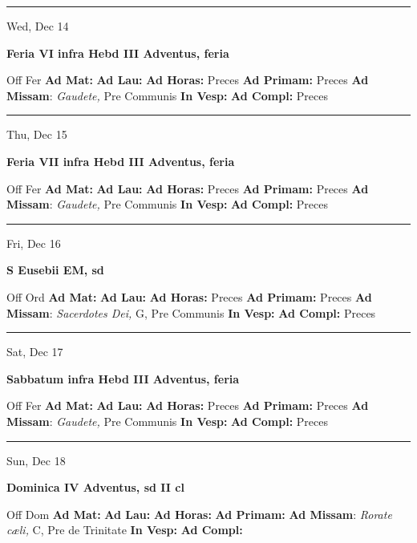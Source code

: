 \documentclass[letterpaper, 10pt]{article}
\begin{document}
\hrule
\begin{center}
Wed, Dec 14
\end{center}\textbf{ \large Feria VI infra Hebd III Adventus, \textnormal{\normalsize feria}}
\begin{justify}
Off Fer
\textbf{Ad Mat: }
\textbf{Ad Lau: }
\textbf{Ad Horas: }Preces
\textbf{Ad Primam: }Preces
\textbf{Ad Missam}: \textit{Gaudete,} Pre Communis
\textbf{In Vesp: }
\textbf{Ad Compl: }Preces\end{justify}



\hrule
\begin{center}
Thu, Dec 15
\end{center}\textbf{ \large Feria VII infra Hebd III Adventus, \textnormal{\normalsize feria}}
\begin{justify}
Off Fer
\textbf{Ad Mat: }
\textbf{Ad Lau: }
\textbf{Ad Horas: }Preces
\textbf{Ad Primam: }Preces
\textbf{Ad Missam}: \textit{Gaudete,} Pre Communis
\textbf{In Vesp: }
\textbf{Ad Compl: }Preces\end{justify}



\hrule
\begin{center}
Fri, Dec 16
\end{center}\textbf{ \large S Eusebii EM, \textnormal{\normalsize sd}}
\begin{justify}
Off Ord
\textbf{Ad Mat: }
\textbf{Ad Lau: }
\textbf{Ad Horas: }Preces
\textbf{Ad Primam: }Preces
\textbf{Ad Missam}: \textit{Sacerdotes Dei,} G, Pre Communis
\textbf{In Vesp: }
\textbf{Ad Compl: }Preces\end{justify}



\hrule
\begin{center}
Sat, Dec 17
\end{center}\textbf{ \large Sabbatum infra Hebd III Adventus, \textnormal{\normalsize feria}}
\begin{justify}
Off Fer
\textbf{Ad Mat: }
\textbf{Ad Lau: }
\textbf{Ad Horas: }Preces
\textbf{Ad Primam: }Preces
\textbf{Ad Missam}: \textit{Gaudete,} Pre Communis
\textbf{In Vesp: }
\textbf{Ad Compl: }Preces\end{justify}



\hrule
\begin{center}
Sun, Dec 18
\end{center}\textbf{ \large Dominica IV Adventus, \textnormal{\normalsize sd II cl}}
\begin{justify}
Off Dom
\textbf{Ad Mat: }
\textbf{Ad Lau: }
\textbf{Ad Horas: }
\textbf{Ad Primam: }
\textbf{Ad Missam}: \textit{Rorate cæli,} C, Pre de Trinitate
\textbf{In Vesp: }
\textbf{Ad Compl: }\end{justify}
\end{document}
